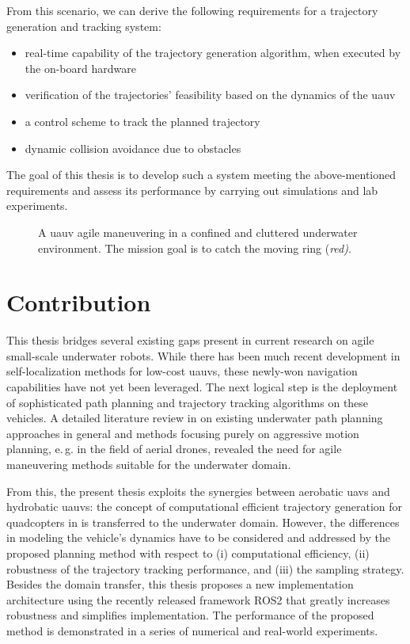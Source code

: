 From this scenario, we can derive the following requirements for a trajectory generation and tracking system:
\begin{itemize}
    \item real-time capability of the trajectory generation algorithm, when executed by the on-board hardware
    \item verification of the trajectories' feasibility based on the dynamics of the \ac{uauv}
    \item a control scheme to track the planned trajectory
    \item dynamic collision avoidance due to obstacles
\end{itemize}

The goal of this thesis is to develop such a system meeting the above-mentioned requirements and assess its performance by carrying out simulations and lab experiments.

\begin{figure}
    \centering
    
    \caption{A \ac{uauv} agile maneuvering in a confined and cluttered underwater environment. The mission goal is to catch the moving ring (\textit{red)}.}
    \label{fig:agile_maneuvering_motivation}
\end{figure}


\section{Contribution}
This thesis bridges several existing gaps present in current research on agile small-scale underwater robots. While there has been much recent development in self-localization methods for low-cost \acp{uauv}, these newly-won navigation capabilities have not yet been leveraged. The next logical step is the deployment of sophisticated path planning and trajectory tracking algorithms on these vehicles. %
A detailed literature review in  on existing underwater path planning approaches in general and methods focusing purely on aggressive motion planning, e.\,g. in the field of aerial drones, revealed the need for agile maneuvering methods suitable for the underwater domain. 

From this, the present thesis exploits the synergies between aerobatic \acp{uav} and hydrobatic \acp{uauv}:  the concept of computational efficient trajectory generation for quadcopters in \cite{MuellerHehn15} is transferred to the underwater domain.
However, the differences in modeling the vehicle's dynamics have to be considered and addressed by the proposed planning method with respect to (i) computational efficiency, (ii) robustness of the trajectory tracking performance, and (iii) the sampling strategy. 
Besides the domain transfer, this thesis proposes a new implementation architecture using the recently released framework ROS2 that greatly increases robustness and simplifies implementation.
The performance of the proposed method is demonstrated in a series of numerical and real-world experiments.


